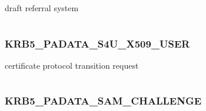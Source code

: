 \documentclass[letterpaper,10pt,english]{sphinxmanual}
\begin{document}
\begin{fulllineitems}
\label{appdev/refs/macros/KRB5_PADATA_REFERRAL:KRB5_PADATA_REFERRAL}
\end{fulllineitems}


draft referral system

\begin{tabulary}{\linewidth}{|L|L|}
\hline

 & 
\\\hline
\end{tabulary}



\subsubsection{KRB5\_PADATA\_S4U\_X509\_USER}
\label{appdev/refs/macros/KRB5_PADATA_S4U_X509_USER:krb5-padata-s4u-x509-user-data}\label{appdev/refs/macros/KRB5_PADATA_S4U_X509_USER::doc}\label{appdev/refs/macros/KRB5_PADATA_S4U_X509_USER:krb5-padata-s4u-x509-user}

\begin{fulllineitems}
\label{appdev/refs/macros/KRB5_PADATA_S4U_X509_USER:KRB5_PADATA_S4U_X509_USER}
\end{fulllineitems}


certificate protocol transition request

\begin{tabulary}{\linewidth}{|L|L|}
\hline

 & 
\\\hline
\end{tabulary}



\subsubsection{KRB5\_PADATA\_SAM\_CHALLENGE}
\label{appdev/refs/macros/KRB5_PADATA_SAM_CHALLENGE:krb5-padata-sam-challenge-data}\label{appdev/refs/macros/KRB5_PADATA_SAM_CHALLENGE::doc}\label{appdev/refs/macros/KRB5_PADATA_SAM_CHALLENGE:krb5-padata-sam-challenge}

\begin{fulllineitems}
\label{appdev/refs/macros/KRB5_PADATA_SAM_CHALLENGE:KRB5_PADATA_SAM_CHALLENGE}
\end{fulllineitems}
\end{document}
